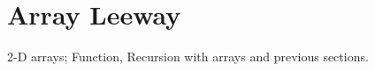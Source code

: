 \section{Array Leeway}
\begin{topics}
2-D arrays; Function, Recursion with arrays and previous sections.
\end{topics}